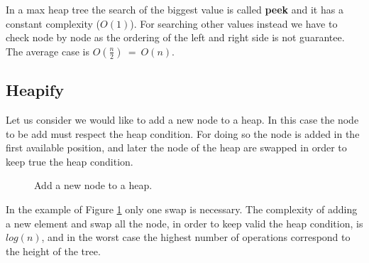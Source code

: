 In a max heap tree the search of the biggest value is called \textbf{peek} and it has a constant complexity (\(O(1)\)). For searching other values instead we have to check node by node as the ordering of the left and right side is not guarantee. The average case is \(O(\frac{n}{2})\ = \ O(n)\).
\subsection{Heapify}
Let us consider we would like to add a new node to a heap. In this case the node to be add must respect the heap condition. For doing so the node is added in the first available position, and later the node of the heap are swapped in order to keep true the heap condition.

\begin{figure}[H]
\centering
{}
\caption[Add a new node to a heap.]{Add a new node to a heap.}
\label{trees_17}
\end{figure}

In the example of Figure \ref{trees_17} only one swap is necessary. The complexity of adding a new element and swap all the node, in order to keep valid the heap condition, is \(log(n)\), and in the worst case the highest number of operations correspond to the height of the tree.

